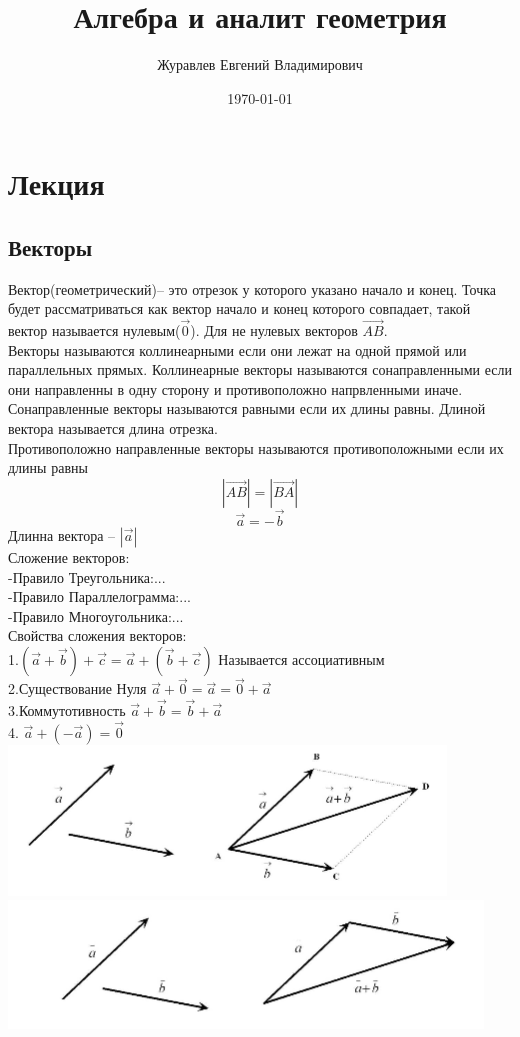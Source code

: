 \documentclass[a4paper, 12pt]{article}
\title{Алгебра и аналит геометрия }
\author{Журавлев Евгений Владимирович}
\date{\today}
\begin{document}
\sffamily
\maketitle
\section{Лекция}
\subsection{Векторы}
Вектор(геометрический)-- это отрезок у которого указано начало и конец.
Точка будет рассматриваться как вектор начало и конец которого совпадает, такой вектор называется нулевым($\vec{0}$). Для не нулевых векторов $  \vec{AB}$.\\
Векторы называются коллинеарными если они лежат на одной прямой или параллельных прямых. Коллинеарные векторы называются сонаправленными если они направленны в одну сторону и противоположно напрвленными иначе.\\
Сонаправленные векторы называются равными если их длины равны. Длиной вектора называется длина отрезка.\\
Противоположно направленные векторы называются противоположными если их длины равны \[
	|\vec{AB}| = |\vec{BA}|
\] 
\[
	\vec{a} = -\vec{b}		
\]
Длинна вектора -- $|\vec{a}|$\\
Сложение векторов: \\
-Правило Треугольника:...\\
-Правило Параллелограмма:...\\
-Правило Многоугольника:...\\
Свойства сложения векторов:\\
1.$ (\vec{a} + \vec{b})+\vec{c} = \vec{a} + (\vec{b}+\vec{c}) $ Называется ассоциативным\\
2.Существование Нуля $ \vec{a} + \vec{0} = \vec{a} = \vec{0} + \vec{a} $\\
3.Коммутотивность $ \vec{a} + \vec{b}= \vec{b} + \vec{a} $\\
4. $ \vec{a} + (-\vec{a}) = \vec{0} $\\

\includegraphics{sum_vec1}\\
\includegraphics{sum_vec2}\\
\end{document}
